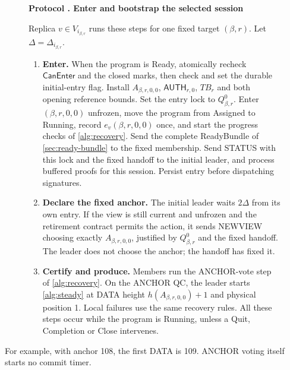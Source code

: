 \documentclass[11pt,a4paper]{article}
\newcommand{\TB}{\mathit{TB}}
\newcommand{\tagg}[1]{\ensuremath{\mathsf{#1}}}
\newcounter{protocol}
\newenvironment{protocol}[3][htbp]{\begin{figure}[#1]\refstepcounter{protocol}\label{#2}
\begin{mdframed}[linewidth=.6pt,skipabove=0pt,skipbelow=0pt,
innertopmargin=7pt,innerbottommargin=7pt]\small
\textbf{Protocol \theprotocol. #3}\par\smallskip}{\end{mdframed}\end{figure}}
\begin{document}
\begin{protocol}[H]{alg:bootstrap}{Enter and bootstrap the selected session}
Replica $v\in V_{i_{\beta,r}}$ runs these steps for one fixed target
$(\beta,r)$. Let $\Delta=\Delta_{i_{\beta,r}}$.
\begin{enumerate}[label=\textbf{\arabic*)},itemsep=3pt]
\item \textbf{Enter.} When the program is Ready, atomically recheck
$\tagg{CanEnter}$ and the closed marks, then check and set the durable
initial-entry flag. Install $A_{\beta,r,0,0}$, $\tagg{AUTH}_{r,0}$,
$\TB_r$ and both opening reference bounds. Set the entry lock to
$Q^0_{\beta,r}$. Enter $(\beta,r,0,0)$ unfrozen, move the program from
Assigned to Running, record $e_v(\beta,r,0,0)$ once, and start the
progress checks of \cref{alg:recovery}. Send the complete ReadyBundle of
\cref{sec:ready-bundle} to the fixed membership. Send STATUS with this
lock and the fixed handoff to the initial leader, and process buffered
proofs for this session. Persist entry before dispatching signatures.
\item \textbf{Declare the fixed anchor.} The initial leader waits
$2\Delta$ from its own entry. If the view is still current and unfrozen
and the retirement contract permits the action, it sends NEWVIEW choosing
exactly $A_{\beta,r,0,0}$, justified by $Q^0_{\beta,r}$ and the fixed
handoff. The leader does not choose the anchor; the handoff has fixed it.
\item \textbf{Certify and produce.} Members run the ANCHOR-vote step of
\cref{alg:recovery}. On the ANCHOR QC, the leader starts
\cref{alg:steady} at DATA height $h(A_{\beta,r,0,0})+1$ and physical
position 1. Local failures use the same recovery rules. All these steps
occur while the program is Running, unless a Quit, Completion or Close
intervenes.
\end{enumerate}
\end{protocol}


For example, with anchor 108, the first DATA is 109. ANCHOR voting itself
starts no commit timer.
\end{document}
